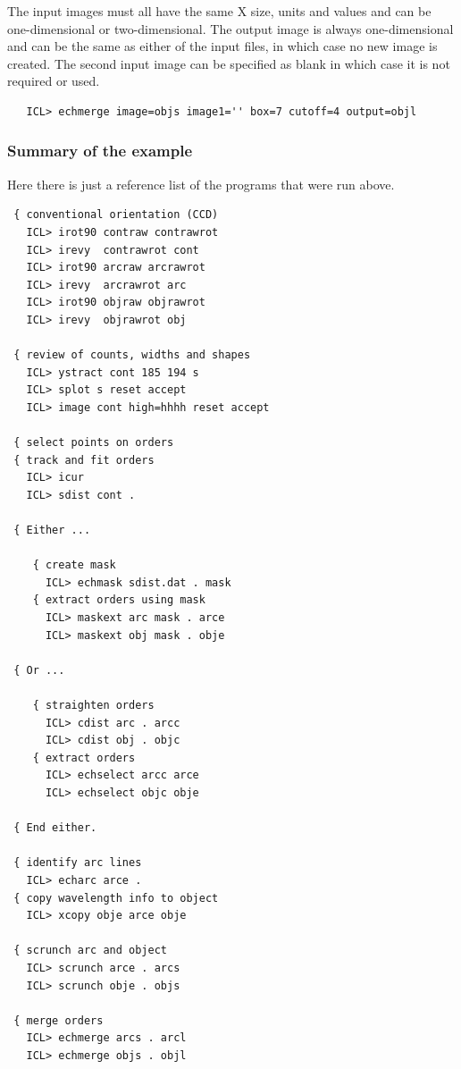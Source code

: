 \documentclass[11pt,twoside]{article}
\begin{document}
   The input images must all have the same X size, units and values and
   can be one-dimensional or two-dimensional. The output image is always
   one-dimensional and can be the same as either of the input files, in
   which case no new image is created. The second input image can be
   specified as blank in which case it is not required or used.

\begin{verbatim}
   ICL> echmerge image=objs image1='' box=7 cutoff=4 output=objl
\end{verbatim}


\subsubsection{\label{techno13summary}Summary of the example}

   Here there is just a reference list of the programs that were run
   above.

\begin{verbatim}
 { conventional orientation (CCD)
   ICL> irot90 contraw contrawrot
   ICL> irevy  contrawrot cont
   ICL> irot90 arcraw arcrawrot
   ICL> irevy  arcrawrot arc
   ICL> irot90 objraw objrawrot
   ICL> irevy  objrawrot obj

 { review of counts, widths and shapes
   ICL> ystract cont 185 194 s
   ICL> splot s reset accept
   ICL> image cont high=hhhh reset accept

 { select points on orders
 { track and fit orders
   ICL> icur
   ICL> sdist cont .

 { Either ...

    { create mask
      ICL> echmask sdist.dat . mask
    { extract orders using mask
      ICL> maskext arc mask . arce
      ICL> maskext obj mask . obje

 { Or ...

    { straighten orders
      ICL> cdist arc . arcc
      ICL> cdist obj . objc
    { extract orders
      ICL> echselect arcc arce
      ICL> echselect objc obje

 { End either.

 { identify arc lines
   ICL> echarc arce .
 { copy wavelength info to object
   ICL> xcopy obje arce obje

 { scrunch arc and object
   ICL> scrunch arce . arcs
   ICL> scrunch obje . objs

 { merge orders
   ICL> echmerge arcs . arcl
   ICL> echmerge objs . objl
\end{verbatim}
\end{document}
